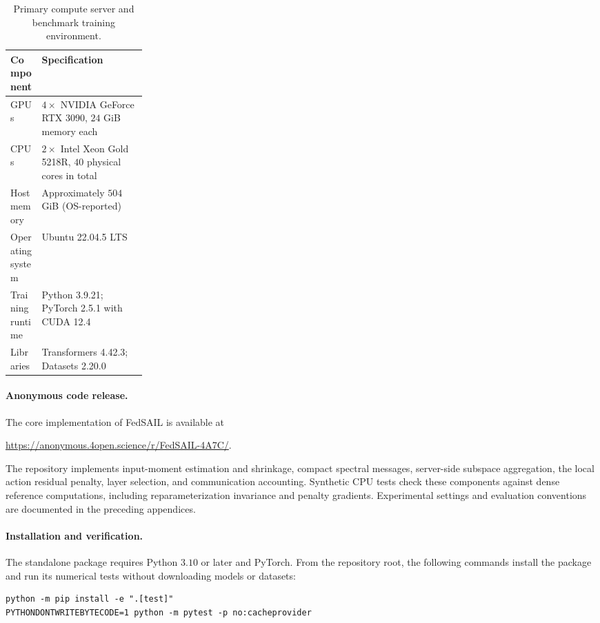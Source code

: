 \documentclass[11pt,letterpaper]{article}
\begin{document}
\begin{table}[!htbp]
    \centering
    \caption{Primary compute server and benchmark training environment.}
    \label{tab:compute-resources}
    \small
    \setlength{\tabcolsep}{5pt}
    \renewcommand{\arraystretch}{1.08}
    \begin{tabular}{@{}p{0.23\linewidth}p{}@{}}
        \toprule
        Component & Specification \\
        \midrule
        GPUs & $4\times$ NVIDIA GeForce RTX 3090, $24$ GiB memory each \\
        CPUs & $2\times$ Intel Xeon Gold 5218R, $40$ physical cores in total \\
        Host memory & Approximately $504$ GiB (OS-reported) \\
        Operating system & Ubuntu 22.04.5 LTS \\
        Training runtime & Python 3.9.21; PyTorch 2.5.1 with CUDA 12.4 \\
        Libraries & Transformers 4.42.3; Datasets 2.20.0 \\
        \bottomrule
    \end{tabular}
\end{table}

\paragraph{Anonymous code release.}
The core implementation of FedSAIL is available at
\begin{center}
    \url{https://anonymous.4open.science/r/FedSAIL-4A7C/}.
\end{center}
The repository implements input-moment estimation and shrinkage, compact
spectral messages, server-side subspace aggregation, the local action
residual penalty, layer selection, and communication accounting.
Synthetic CPU tests check these components against dense reference
computations, including reparameterization invariance and penalty gradients.
Experimental settings and evaluation conventions are documented
in the preceding appendices.

\paragraph{Installation and verification.}
The standalone package requires Python $3.10$ or later and PyTorch.
From the repository root, the following commands install the package
and run its numerical tests without downloading models or datasets:
\begin{verbatim}
python -m pip install -e ".[test]"
PYTHONDONTWRITEBYTECODE=1 python -m pytest -p no:cacheprovider
\end{verbatim}
\end{document}
